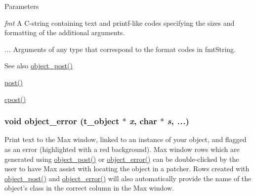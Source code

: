 \begin{DoxyParams}{Parameters}
\item[{\em fmt}]A C-\/string containing text and printf-\/like codes specifying the sizes and formatting of the additional arguments. \item[{\em ...}]Arguments of any type that correspond to the format codes in fmtString.\end{DoxyParams}
\begin{DoxySeeAlso}{See also}
\hyperlink{group__console_gafb92b17363269d4d26de1823cbc2492d}{object\_\-post()} 

\hyperlink{group__console_ga3714108f42b44384b4d58009eafc1806}{post()} 

\hyperlink{group__console_ga94fff7e4ee19b8db6904a009117e0667}{cpost()} 
\end{DoxySeeAlso}
\hypertarget{group__console_ga05f7fed66fafc6e4d2e372b7f0fe4e43}{
\subsubsection[{object\_\-error}]{\setlength{\rightskip}{0pt plus 5cm}void object\_\-error ({\bf t\_\-object} $\ast$ {\em x}, \/  char $\ast$ {\em s}, \/   {\em ...})}}
\label{group__console_ga05f7fed66fafc6e4d2e372b7f0fe4e43}


Print text to the Max window, linked to an instance of your object, and flagged as an error (highlighted with a red background). Max window rows which are generated using \hyperlink{group__console_gafb92b17363269d4d26de1823cbc2492d}{object\_\-post()} or \hyperlink{group__console_ga05f7fed66fafc6e4d2e372b7f0fe4e43}{object\_\-error()} can be double-\/clicked by the user to have Max assist with locating the object in a patcher. Rows created with \hyperlink{group__console_gafb92b17363269d4d26de1823cbc2492d}{object\_\-post()} and \hyperlink{group__console_ga05f7fed66fafc6e4d2e372b7f0fe4e43}{object\_\-error()} will also automatically provide the name of the object's class in the correct column in the Max window.


